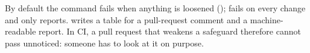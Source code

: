 By default the command fails when anything is loosened ();  fails on every change and  only reports.  writes a table for a pull-request comment and  a machine-readable report. In CI, a pull request that weakens a safeguard therefore cannot pass unnoticed: someone has to look at it on purpose.
